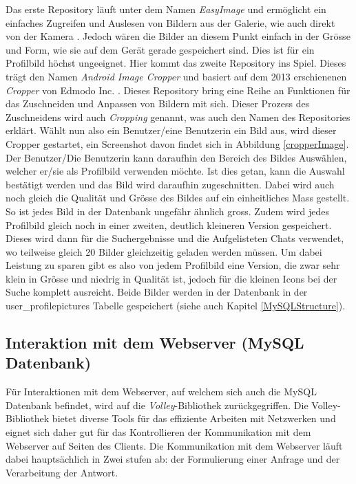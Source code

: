 \documentclass[../main.tex]{subfiles}
\begin{document}
	Das erste Repository läuft unter dem Namen \emph{EasyImage} und ermöglicht ein einfaches Zugreifen und Auslesen von Bildern aus der Galerie, wie auch direkt von der Kamera \cite{EasyImage}. Jedoch wären die Bilder an diesem Punkt einfach in der Grösse und Form, wie sie auf dem Gerät gerade gespeichert sind. Dies ist für ein Profilbild höchst ungeeignet. Hier kommt das zweite Repository ins Spiel. Dieses trägt den Namen \emph{Android Image Cropper} und basiert auf dem 2013 erschienenen \emph{Cropper} von Edmodo Inc. \cite{Cropper} \cite{edmodo}. Dieses Repository bring eine Reihe an Funktionen für das Zuschneiden und Anpassen von Bildern mit sich. Dieser Prozess des Zuschneidens wird auch \emph{Cropping} genannt, was auch den Namen des Repositories erklärt. Wählt nun also ein Benutzer/eine Benutzerin ein Bild aus, wird dieser Cropper gestartet, ein Screenshot davon findet sich in Abbildung \ref{cropperImage}. Der Benutzer/Die Benutzerin kann daraufhin den Bereich des Bildes Auswählen, welcher er/sie als Profilbild verwenden möchte. Ist dies getan, kann die Auswahl bestätigt werden und das Bild wird daraufhin zugeschnitten. Dabei wird auch noch gleich die Qualität und Grösse des Bildes auf ein einheitliches Mass gestellt. So ist jedes Bild in der Datenbank ungefähr ähnlich gross. Zudem wird jedes Profilbild gleich noch in einer zweiten, deutlich kleineren Version gespeichert. Dieses wird dann für die Suchergebnisse und die Aufgelisteten Chats verwendet, wo teilweise gleich 20 Bilder gleichzeitig geladen werden müssen. Um dabei Leistung zu sparen gibt es also von jedem Profilbild eine Version, die zwar sehr klein in Grösse und niedrig in Qualität ist, jedoch für die kleinen Icons bei der Suche komplett ausreicht. Beide Bilder werden in der Datenbank in der user\_profilepictures Tabelle gespeichert (siehe auch Kapitel \ref{MySQLStructure}).
	
	\subsection{Interaktion mit dem Webserver (MySQL Datenbank)}
	Für Interaktionen mit dem Webserver, auf welchem sich auch die MySQL Datenbank befindet, wird auf die \emph{Volley}-Bibliothek zurückgegriffen. Die Volley-Bibliothek bietet diverse Tools für das effiziente Arbeiten mit Netzwerken und eignet sich daher gut für das Kontrollieren der Kommunikation mit dem Webserver auf Seiten des Clients. Die Kommunikation mit dem Webserver läuft dabei hauptsächlich in Zwei stufen ab: der Formulierung einer Anfrage und der Verarbeitung der Antwort.
	
\end{document}
